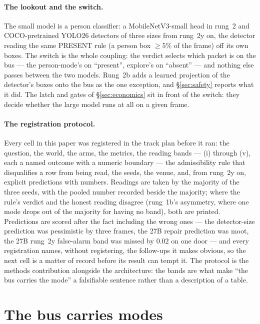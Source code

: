 \documentclass[11pt]{article}
\begin{document}
\paragraph{The lookout and the switch.} The small model is a person
classifier: a MobileNetV3-small head in rung~2 and COCO-pretrained YOLO26
detectors of three sizes from rung~2y on, the detector reading the same
PRESENT rule (a person box $\ge 5\%$ of the frame) off its own boxes.
The switch is the whole coupling: the verdict selects which packet is on
the bus --- the person-mode's on ``present'', explore's on ``absent'' ---
and nothing else passes between the two models. Rung~2b adds a learned
projection of the detector's boxes onto the bus as the one exception,
and \S\ref{sec:safety} reports what it did. The latch and gates of
\S\ref{sec:economics} sit in front of the switch: they decide whether the
large model runs at all on a given frame.

\paragraph{The registration protocol.} Every cell in this paper was
registered in the track plan before it ran: the question, the world,
the arms, the metrics, the reading bands --- (i) through (v), each a
named outcome with a numeric boundary --- the admissibility rule that
disqualifies a row from being read, the seeds, the venue, and, from
rung~2y on, explicit predictions with numbers. Readings are taken by
the majority of the three seeds, with the pooled number recorded
beside the majority; where the rule's verdict and the honest reading
disagree (rung~1b's asymmetry, where one mode drops out of the majority
for having no band), both are printed. Predictions are scored after the
fact including the wrong ones --- the detector-size prediction was
pessimistic by three frames, the 27B repair prediction was moot, the
27B rung~2y false-alarm band was missed by $0.02$ on one door --- and
every registration names, without registering, the follow-ups it makes
obvious, so the next cell is a matter of record before its result can
tempt it. The protocol is the methods contribution alongside the
architecture: the bands are what make ``the bus carries the mode'' a
falsifiable sentence rather than a description of a table.


\section{The bus carries modes}\label{sec:carriage}
\end{document}
